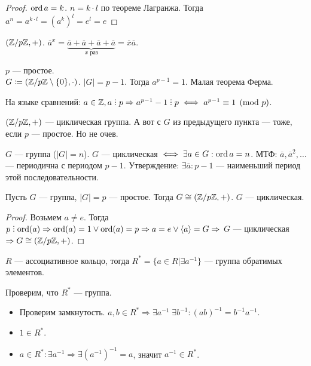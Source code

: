 \begin{proof}
    $\operatorname{ord} a = k$.  $n = k \cdot l$ по теореме Лагранжа. Тогда  $a^n = a^{k\cdot l} = \left(a^k\right)^l = e^l = e$
\end{proof}
\begin{example}
    $(\mathbb{Z} / p\mathbb{Z}, +)$. $\overline{a}^x = \underbrace{\overline{a} + \overline{a} + \overline{a} + \overline{a}}_{x\text{ раз}} = \overline{x}\overline{a}$.
\end{example}
\begin{example}
    $p$ --- простое.\\
    $G \coloneqq (\mathbb{Z} / p\mathbb{Z} \setminus \{0\}, \cdot) $. $|G| = p - 1$. Тогда $a^{p-1} = 1$. Малая теорема Ферма. 
\end{example}
\slashn
На языке сравнений: $a \in \Z, a \divby p \Rightarrow a^{p-1} - 1 \divby p \iff a^{p-1} \equiv 1 \pmod{p}$. 
 \begin{example}
     $(\mathbb{Z} / p\mathbb{Z}, +)$ --- циклическая группа. А вот с  $G$ из предыдущего пункта --- тоже, если $p$ --- простое. Но не очев.  
\end{example}
\begin{statement}
    $G$ --- группа ($|G|=n$). $G$ --- циклическая  $\iff \exists a \in G: \operatorname{ord} a = n$.  
    МТФ: $\overline{a}, \overline{a}^2,\ldots$ --- периодична с периодом $p-1$. Утверждение:  $\exists \overline{a}: p-1$ --- наименьший период этой последовательности.
\end{statement}
\begin{remark}
    Пусть $G$ --- группа,  $|G| = p$ --- простое. Тогда  $G \cong (\mathbb{Z} / p\mathbb{Z}, +)$.  $G$ --- циклическая.
\end{remark}
\begin{proof}
    Возьмем $a \neq e$. Тогда  $p \divby \ord(a) \Rightarrow \ord(a) = 1 \lor \ord(a) = p \Rightarrow a = e \lor \langle a \rangle = G \Rightarrow$
    $G$ --- циклическая  $\Rightarrow G \cong (\mathbb{Z} / p \mathbb{Z}, +)$. 
\end{proof}
\begin{definition}
    $R$ --- ассоциативное кольцо, тогда  $R^* = \{a \in R | \exists a^{-1}\}$ --- группа обратимых элементов.
\end{definition}
Проверим, что $R^*$ --- группа. 
 \begin{itemize}
     \item Проверим замкнутость. $a, b \in R^* \Rightarrow \exists a^{-1}\; \exists b^{-1}: (ab)^{-1} = b^{-1} a^{-1}$.
     \item  $1 \in R^*$. 
     \item $a \in R^*: \exists a^{-1} \Rightarrow \exists \left(a^{-1}\right)^{-1} = a$, значит $a^{-1} \in R^*$. 
\end{itemize}
